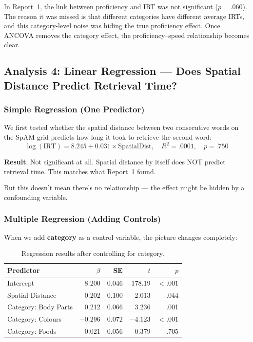 \documentclass[12pt, a4paper]{article}
\begin{document}
In Report~1, the link between proficiency and IRT was not significant ($p = .060$). The reason it was missed is that different categories have different average IRTs, and this category-level noise was hiding the true proficiency effect. Once ANCOVA removes the category effect, the proficiency--speed relationship becomes clear.


\subsection{Analysis 4: Linear Regression --- Does Spatial Distance Predict Retrieval Time?}

\subsubsection{Simple Regression (One Predictor)}

We first tested whether the spatial distance between two consecutive words on the SpAM grid predicts how long it took to retrieve the second word:
\[
\log(\text{IRT}) = 8.245 + 0.031 \times \text{SpatialDist}, \quad R^2 = .0001, \quad p = .750
\]

\textbf{Result}: Not significant at all. Spatial distance by itself does NOT predict retrieval time. This matches what Report~1 found.

But this doesn't mean there's no relationship --- the effect might be hidden by a confounding variable.

\subsubsection{Multiple Regression (Adding Controls)}

When we add \textbf{category} as a control variable, the picture changes completely:

\begin{table}[H]
\centering
\caption{Regression results after controlling for category.}
\label{tab:reg_model2}
\begin{tabular}{lrrrr}
\toprule
\textbf{Predictor} & \textbf{$\beta$} & \textbf{SE} & \textbf{$t$} & \textbf{$p$} \\
\midrule
Intercept & 8.200 & 0.046 & 178.19 & $<.001$ \\
Spatial Distance & 0.202 & 0.100 & 2.013 & .044 \\
Category: Body Parts & 0.212 & 0.066 & 3.236 & .001 \\
Category: Colours & $-0.296$ & 0.072 & $-4.123$ & $<.001$ \\
Category: Foods & 0.021 & 0.056 & 0.379 & .705 \\
\bottomrule
\end{tabular}
\end{table}
\end{document}
